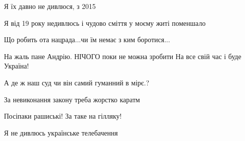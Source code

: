 \begin{itemize}
 
Я їх давно не дивлюся, з 2015

 
Я від 19 року недивлюсь і чудово сміття у моєму житі поменшало

 
Що робить ота нацрада...чи їм немає з ким боротися...

 
На жаль пане Андрію.
НІЧОГО поки не можна зробити
На все свій час і буде Україна!

 
А де ж наш суд чи він самий гуманний в мірє.?

 
За невиконання закону треба жорстко каратм

 
Посіпаки рашиські! За таке на гілляку!

 
Я не дивлюсь українське телебачення

\end{itemize}

